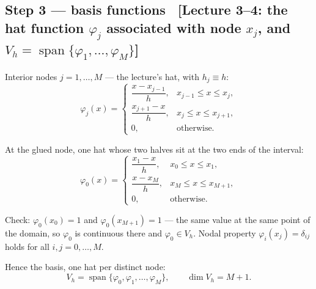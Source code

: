 \documentclass[11pt]{article}
\newcommand{\src}[1]{{\small\color{black!55}\textsf{[#1]}}}
\begin{document}
\subsection*{Step 3 --- basis functions
  \ \src{Lecture 3--4: the hat function $\varphi_j$ associated with node $x_j$,
         and $V_h=\operatorname{span}\{\varphi_1,\dots,\varphi_M\}$}}

\begin{steps}
\item Interior nodes $j=1,\dots,M$ --- the lecture's hat, with $h_j\equiv h$:
\begin{equation}\label{eq:hat}
  \varphi_j(x)=
  \begin{cases}
    \dfrac{x-x_{j-1}}{h}, & x_{j-1}\le x\le x_j,\\[2ex]
    \dfrac{x_{j+1}-x}{h}, & x_j\le x\le x_{j+1},\\[1.2ex]
    0, & \text{otherwise.}
  \end{cases}
\end{equation}

\item At the glued node, one hat whose two halves sit at the two ends of the
      interval:
\begin{equation}\label{eq:hat0}
  \varphi_0(x)=
  \begin{cases}
    \dfrac{x_1-x}{h}, & x_0\le x\le x_1,\\[2ex]
    \dfrac{x-x_M}{h}, & x_M\le x\le x_{M+1},\\[1.2ex]
    0, & \text{otherwise.}
  \end{cases}
\end{equation}

\item Check: $\varphi_0(x_0)=1$ and $\varphi_0(x_{M+1})=1$ --- the same value at
      the same point of the domain, so $\varphi_0$ is continuous there and
      $\varphi_0\in V_h$. Nodal property $\varphi_i(x_j)=\delta_{ij}$ holds for
      all $i,j=0,\dots,M$.

\item Hence the basis, one hat per distinct node:
\begin{equation}\label{eq:span}
  V_h=\operatorname{span}\{\varphi_0,\varphi_1,\dots,\varphi_M\},
  \qquad \dim V_h=M+1 .
\end{equation}
\end{steps}
\end{document}
